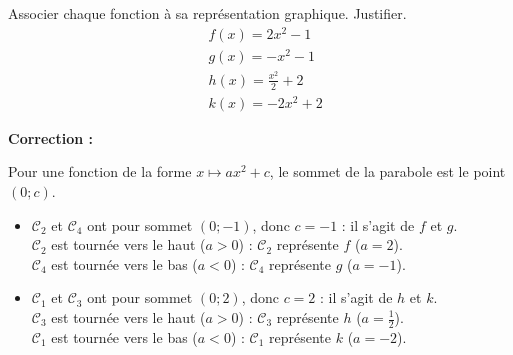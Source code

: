 \documentclass[11pt,a4paper]{book}
\begin{document}
\begin{minipage}[c]{0.40\linewidth}
	Associer chaque fonction à sa représentation graphique. Justifier.
	$$
	\begin{aligned}
		& f(x)=2x^{2}-1 \\
		& g(x)=-x^{2}-1 \\
		& h(x)=\frac{x^{2}}{2}+2 \\
		& k(x)=-2x^{2}+2
	\end{aligned}
	$$
\end{minipage} \hfill
\begin{minipage}[c]{0.56\linewidth}
	\begin{center}
	\end{center}
\end{minipage}

\medskip
\noindent\textbf{\color{red!75!black}Correction :}

\smallskip
\begin{corrBox}
	Pour une fonction de la forme $x\mapsto ax^2+c$, le sommet de la parabole est le point $(0 ; c)$.
	\begin{itemize}
		\item $\mathcal{C}_2$ et $\mathcal{C}_4$ ont pour sommet $(0 ; -1)$, donc $c=-1$ : il s'agit de $f$ et $g$.\\
		$\mathcal{C}_2$ est tournée vers le haut ($a>0$) : $\mathcal{C}_2$ représente $f$ ($a=2$).\\
		$\mathcal{C}_4$ est tournée vers le bas ($a<0$) : $\mathcal{C}_4$ représente $g$ ($a=-1$).
		\item $\mathcal{C}_1$ et $\mathcal{C}_3$ ont pour sommet $(0 ; 2)$, donc $c=2$ : il s'agit de $h$ et $k$.\\
		$\mathcal{C}_3$ est tournée vers le haut ($a>0$) : $\mathcal{C}_3$ représente $h$ ($a=\frac12$).\\
		$\mathcal{C}_1$ est tournée vers le bas ($a<0$) : $\mathcal{C}_1$ représente $k$ ($a=-2$).
	\end{itemize}
\end{corrBox}
\end{document}
